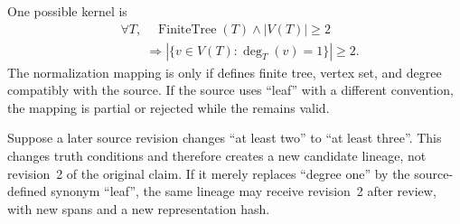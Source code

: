 One possible \MathClaimIR{} kernel is
\begin{align*}
&\forall T,\quad
\operatorname{FiniteTree}(T)\land |V(T)|\geq2\\
&\qquad\Longrightarrow
\left|\{v\in V(T):\deg_T(v)=1\}\right|\geq2.
\end{align*}
The normalization mapping is  only if \MathClaimIR{} defines finite tree, vertex set, and degree compatibly with the source. If the source uses ``leaf'' with a different convention, the mapping is partial or rejected while the \ScientificClaim{} remains valid.

Suppose a later source revision changes ``at least two'' to ``at least three''. This changes truth conditions and therefore creates a new candidate lineage, not revision~2 of the original claim. If it merely replaces ``degree one'' by the source-defined synonym ``leaf'', the same lineage may receive revision~2 after review, with new spans and a new representation hash.
